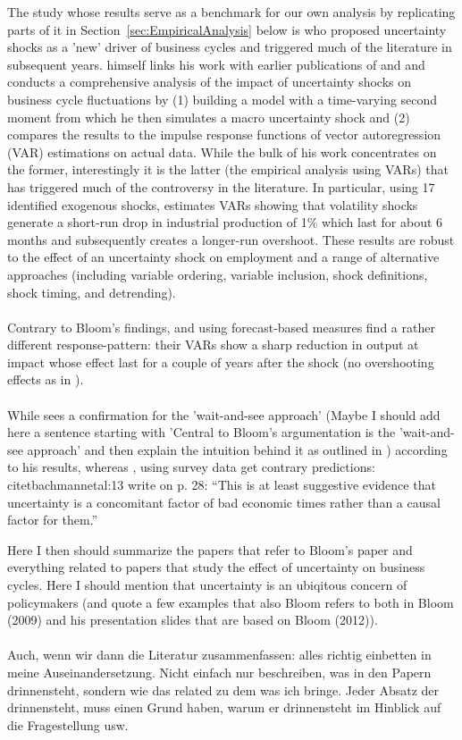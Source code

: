 \documentclass[a4paper,12pt,oneside,pointednumbers,bibtotoc,bigheadings,liststotoc]{scrbook}
\begin{document}
The study whose results serve as a benchmark for our own analysis by replicating parts of it in Section~\ref{sec:EmpiricalAnalysis} below is \citet{bloom:09} who proposed uncertainty shocks as a 'new' driver of business cycles and triggered much of the literature in subsequent years. \citet{bloom:09} himself links his work with earlier publications of \citet{bernanke:83} and \citet{hassler:96} and conducts a comprehensive analysis of the impact of uncertainty shocks on business cycle fluctuations by (1) building a model with a time-varying second moment from which he then simulates a macro uncertainty shock and (2) compares the results to the impulse response functions of vector autoregression (VAR) estimations on actual data. While the bulk of his work concentrates on the former, interestingly it is the latter (the empirical analysis using VARs) that has triggered much of the controversy in the literature. In particular, using 17 identified exogenous shocks, \citet{bloom:09} estimates VARs showing that volatility shocks generate a short-run drop in industrial production of 1\% which last for about 6 months and subsequently creates a longer-run overshoot. These results are robust to the effect of an uncertainty shock on employment and a range of alternative approaches (including variable ordering, variable inclusion, shock definitions, shock timing, and detrending).\\
\\
Contrary to Bloom's findings, \citet{juradoetal:15} and \citet{bachmannetal:13} using forecast-based measures find a rather different response-pattern: their VARs show a sharp reduction in output at impact whose effect last for a couple of years after the shock (no overshooting effects as in \citet{bloom:09}).\\
\\
While \citet{bloom:09} sees a confirmation for the 'wait-and-see approach' (Maybe I should add here a sentence starting with 'Central to Bloom's argumentation is the 'wait-and-see approach' and then explain the intuition behind it as outlined in \citet{bachmannetal:13}) according to his results, whereas \citet{bachmannetal:13}, using survey data get contrary predictions: 
\\
citet{bachmannetal:13} write on p. 28: ``This is at least suggestive evidence that uncertainty is a concomitant factor of bad economic times rather than a causal factor for them.''

Here I then should summarize the papers that refer to Bloom's paper and everything related to papers that study the effect of uncertainty on business cycles.
Here I should mention that uncertainty is an ubiqitous concern of policymakers (and quote a few examples that also Bloom refers to both in Bloom (2009) and his presentation slides that are based on Bloom (2012)).\\
\\
Auch, wenn wir dann die Literatur zusammenfassen: alles richtig einbetten in meine Auseinandersetzung. Nicht einfach nur beschreiben, was in den Papern drinnensteht, sondern wie das related zu dem was ich bringe. Jeder Absatz der drinnensteht, muss einen Grund haben, warum er drinnensteht im Hinblick auf die Fragestellung usw. 
\end{document}

